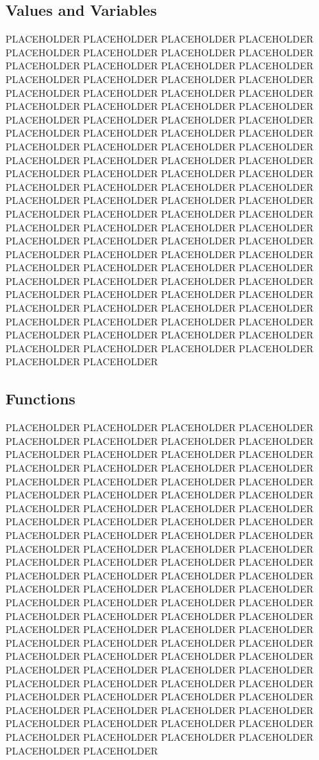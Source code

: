 \subsection{Values and Variables}

PLACEHOLDER PLACEHOLDER PLACEHOLDER PLACEHOLDER PLACEHOLDER PLACEHOLDER PLACEHOLDER PLACEHOLDER PLACEHOLDER PLACEHOLDER PLACEHOLDER PLACEHOLDER PLACEHOLDER PLACEHOLDER PLACEHOLDER PLACEHOLDER PLACEHOLDER PLACEHOLDER PLACEHOLDER PLACEHOLDER PLACEHOLDER PLACEHOLDER PLACEHOLDER PLACEHOLDER PLACEHOLDER PLACEHOLDER PLACEHOLDER PLACEHOLDER PLACEHOLDER PLACEHOLDER PLACEHOLDER PLACEHOLDER PLACEHOLDER PLACEHOLDER PLACEHOLDER PLACEHOLDER PLACEHOLDER PLACEHOLDER PLACEHOLDER PLACEHOLDER PLACEHOLDER PLACEHOLDER PLACEHOLDER PLACEHOLDER PLACEHOLDER PLACEHOLDER PLACEHOLDER PLACEHOLDER PLACEHOLDER PLACEHOLDER PLACEHOLDER PLACEHOLDER PLACEHOLDER PLACEHOLDER PLACEHOLDER PLACEHOLDER PLACEHOLDER PLACEHOLDER PLACEHOLDER PLACEHOLDER PLACEHOLDER PLACEHOLDER PLACEHOLDER PLACEHOLDER PLACEHOLDER PLACEHOLDER PLACEHOLDER PLACEHOLDER PLACEHOLDER PLACEHOLDER PLACEHOLDER PLACEHOLDER PLACEHOLDER PLACEHOLDER PLACEHOLDER PLACEHOLDER PLACEHOLDER PLACEHOLDER PLACEHOLDER PLACEHOLDER PLACEHOLDER PLACEHOLDER PLACEHOLDER PLACEHOLDER PLACEHOLDER PLACEHOLDER PLACEHOLDER PLACEHOLDER PLACEHOLDER PLACEHOLDER PLACEHOLDER PLACEHOLDER PLACEHOLDER PLACEHOLDER PLACEHOLDER PLACEHOLDER PLACEHOLDER PLACEHOLDER

\subsection{Functions}

PLACEHOLDER PLACEHOLDER PLACEHOLDER PLACEHOLDER PLACEHOLDER PLACEHOLDER PLACEHOLDER PLACEHOLDER PLACEHOLDER PLACEHOLDER PLACEHOLDER PLACEHOLDER PLACEHOLDER PLACEHOLDER PLACEHOLDER PLACEHOLDER PLACEHOLDER PLACEHOLDER PLACEHOLDER PLACEHOLDER PLACEHOLDER PLACEHOLDER PLACEHOLDER PLACEHOLDER PLACEHOLDER PLACEHOLDER PLACEHOLDER PLACEHOLDER PLACEHOLDER PLACEHOLDER PLACEHOLDER PLACEHOLDER PLACEHOLDER PLACEHOLDER PLACEHOLDER PLACEHOLDER PLACEHOLDER PLACEHOLDER PLACEHOLDER PLACEHOLDER PLACEHOLDER PLACEHOLDER PLACEHOLDER PLACEHOLDER PLACEHOLDER PLACEHOLDER PLACEHOLDER PLACEHOLDER PLACEHOLDER PLACEHOLDER PLACEHOLDER PLACEHOLDER PLACEHOLDER PLACEHOLDER PLACEHOLDER PLACEHOLDER PLACEHOLDER PLACEHOLDER PLACEHOLDER PLACEHOLDER PLACEHOLDER PLACEHOLDER PLACEHOLDER PLACEHOLDER PLACEHOLDER PLACEHOLDER PLACEHOLDER PLACEHOLDER PLACEHOLDER PLACEHOLDER PLACEHOLDER PLACEHOLDER PLACEHOLDER PLACEHOLDER PLACEHOLDER PLACEHOLDER PLACEHOLDER PLACEHOLDER PLACEHOLDER PLACEHOLDER PLACEHOLDER PLACEHOLDER PLACEHOLDER PLACEHOLDER PLACEHOLDER PLACEHOLDER PLACEHOLDER PLACEHOLDER PLACEHOLDER PLACEHOLDER PLACEHOLDER PLACEHOLDER PLACEHOLDER PLACEHOLDER PLACEHOLDER PLACEHOLDER PLACEHOLDER PLACEHOLDER

